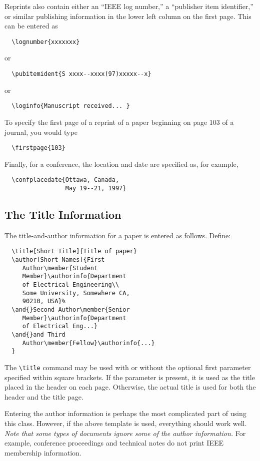 \documentclass[%
	final,
	notitlepage,
	narroweqnarray,
	inline,
	twoside,
	]{ieee}
\begin{document}
Reprints also contain either an ``IEEE log number,'' a ``publisher
item identifier,'' or similar publishing information in the lower left
column on the first page. This can be entered as
\begin{verbatim}
  \lognumber{xxxxxxx}
\end{verbatim}
or
\begin{verbatim}
  \pubitemident{S xxxx--xxxx(97)xxxxx--x}
\end{verbatim}
or
\begin{verbatim}
  \loginfo{Manuscript received... }
\end{verbatim}
To specify the first page of a reprint of a paper beginning on page 
103 of a journal, you would type
\begin{verbatim}
  \firstpage{103}
\end{verbatim}
Finally, for a conference, the location and date are specified as, for
example,
\begin{verbatim}
  \confplacedate{Ottawa, Canada,  
                 May 19--21, 1997}
\end{verbatim}

\subsection{The Title Information}

The title-and-author information for a paper is entered as follows.
Define:
\begin{verbatim}
  \title[Short Title]{Title of paper}
  \author[Short Names]{First 
     Author\member{Student 
     Member}\authorinfo{Department 
     of Electrical Engineering\\ 
     Some University, Somewhere CA, 
     90210, USA}% 
  \and{}Second Author\member{Senior 
     Member}\authorinfo{Department 
     of Electrical Eng...}
  \and{}and Third 
     Author\member{Fellow}\authorinfo{...}
  }
\end{verbatim}

The \verb|\title| command may be used with or without the optional
first parameter specified within square brackets. If the parameter is
present, it is used as the title placed in the header on each page.
Otherwise, the actual title is used for both the header and the title
page.

Entering the author information is perhaps the most complicated part
of using this class. However, if the above template is used,
everything should work well. \emph{Note that some types of documents
ignore some of the author information.} For example, conference
proceedings and technical notes do not print IEEE membership
information.
\end{document}
